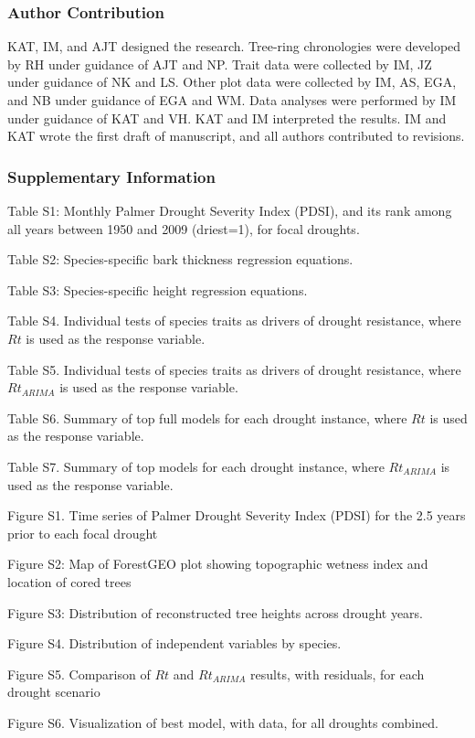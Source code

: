\documentclass[
]{article}
\begin{document}
\hypertarget{author-contribution}{%
\subsubsection{Author Contribution}\label{author-contribution}}

KAT, IM, and AJT designed the research. Tree-ring chronologies were
developed by RH under guidance of AJT and NP. Trait data were collected
by IM, JZ under guidance of NK and LS. Other plot data were collected by
IM, AS, EGA, and NB under guidance of EGA and WM. Data analyses were
performed by IM under guidance of KAT and VH. KAT and IM interpreted the
results. IM and KAT wrote the first draft of manuscript, and all authors
contributed to revisions.

\hypertarget{supplementary-information}{%
\subsubsection{Supplementary
Information}\label{supplementary-information}}

Table S1: Monthly Palmer Drought Severity Index (PDSI), and its rank
among all years between 1950 and 2009 (driest=1), for focal droughts.

Table S2: Species-specific bark thickness regression equations.

Table S3: Species-specific height regression equations.

Table S4. Individual tests of species traits as drivers of drought
resistance, where \(Rt\) is used as the response variable.

Table S5. Individual tests of species traits as drivers of drought
resistance, where \(Rt_{ARIMA}\) is used as the response variable.

Table S6. Summary of top full models for each drought instance, where
\(Rt\) is used as the response variable.

Table S7. Summary of top models for each drought instance, where
\(Rt_{ARIMA}\) is used as the response variable.

Figure S1. Time series of Palmer Drought Severity Index (PDSI) for the
2.5 years prior to each focal drought

Figure S2: Map of ForestGEO plot showing topographic wetness index and
location of cored trees

Figure S3: Distribution of reconstructed tree heights across drought
years.

Figure S4. Distribution of independent variables by species.

Figure S5. Comparison of \(Rt\) and \(Rt_{ARIMA}\) results, with
residuals, for each drought scenario

Figure S6. Visualization of best model, with data, for all droughts
combined.

  
\end{document}
